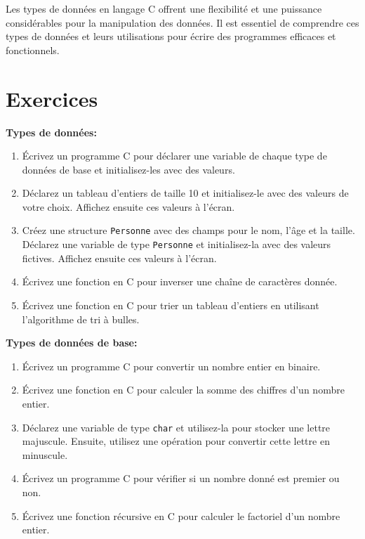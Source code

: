 Les types de données en langage C offrent une flexibilité et une puissance considérables pour la manipulation des données. Il est essentiel de comprendre ces types de données et leurs utilisations pour écrire des programmes efficaces et fonctionnels.


\section{Exercices}

\textbf{Types de données:}

\begin{enumerate}
	\item Écrivez un programme C pour déclarer une variable de chaque type de données de base et initialisez-les avec des valeurs.
	\item Déclarez un tableau d'entiers de taille 10 et initialisez-le avec des valeurs de votre choix. Affichez ensuite ces valeurs à l'écran.
	\item Créez une structure \texttt{Personne} avec des champs pour le nom, l'âge et la taille. Déclarez une variable de type \texttt{Personne} et initialisez-la avec des valeurs fictives. Affichez ensuite ces valeurs à l'écran.
	\item Écrivez une fonction en C pour inverser une chaîne de caractères donnée.
	\item Écrivez une fonction en C pour trier un tableau d'entiers en utilisant l'algorithme de tri à bulles.
\end{enumerate}

\textbf{Types de données de base:}

\begin{enumerate}
	\item Écrivez un programme C pour convertir un nombre entier en binaire.
	\item Écrivez une fonction en C pour calculer la somme des chiffres d'un nombre entier.
	\item Déclarez une variable de type \texttt{char} et utilisez-la pour stocker une lettre majuscule. Ensuite, utilisez une opération pour convertir cette lettre en minuscule.
	\item Écrivez un programme C pour vérifier si un nombre donné est premier ou non.
	\item Écrivez une fonction récursive en C pour calculer le factoriel d'un nombre entier.
\end{enumerate}


